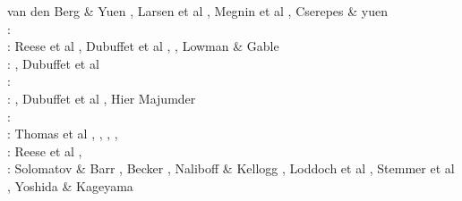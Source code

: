 \begin{scriptsize}
                      van den Berg \& Yuen \cite{vayu97}, Larsen et al \cite{laym97},
                      Megnin et al \cite{mebr97}, Cserepes \& yuen \cite{csyu97}\\
\nineteenninetyeight: \cite{ande98}\cite{iwho98}\cite{devv98}\cite{tack98}\cite{tack98b}\cite{trha98b}
      \cite{trha98}\cite{burl98}\cite{mokm98}\cite{lena98}\cite{vayu98}\cite{wema98}\\
\nineteenninetynine: Reese et al \cite{resb99}, Dubuffet et al \cite{duyr99}, \cite{vazh99}\cite{dava99}\cite{tabg99}\cite{como99}\cite{cicv99}\cite{trrj99},
                      Lowman \& Gable \cite{loga99}\\ 
\twothousand: \cite{albe00}\cite{hayu00}
              \cite{devv00b}\cite{tack00}
              \cite{tack00b}\cite{tack00c}
              \cite{tack00d}\cite{zhzm00}
              \cite{legm00}\cite{conr00}
              \cite{somo00},  Dubuffet et al \cite{duyu00,duyy00}\\
\twothousandone: \cite{vank01}\cite{riyb01}
                 \cite{lemo01}\cite{vays01}
                 \cite{moqu01}\cite{zhon01}
                 \cite{burm01}\cite{dabu01}\\
\twothousandtwo: \cite{tasu02}\cite{modm02}
                 \cite{tack02}\cite{vaya02}
                 \cite{vayu02}\cite{taxi02}
                 \cite{scbh02}\cite{strb02}, 
                 Dubuffet et al \cite{duyr02}, Hier Majumder \etal{} \cite{hiys02}\\
\twothousandthree: \cite{hapa03}\cite{lemo03}
                   \cite{mumc03}\cite{fasa03}
                   \cite{heta03}\cite{sibu03}
                   \cite{ogaw03,ogaw03b}\\
\twothousandfour: Thomas et al \cite{thkl04}, \cite{vavv04b}
                  \cite{xita04b}\cite{xita04},
                  \cite{nata04b}\cite{vayr04},
                  \cite{brws04}\cite{stsh04},
                  \cite{scbh04}\\
\twothousandfive: Reese et al \cite{resb05}, \cite{taxn05}
                  \cite{bupc05}\cite{grlt05}
                  \cite{lemj05}\cite{kogk05}
                  \cite{mczh05b}\cite{vary05}
                  \cite{nata05}\cite{nabu05}
                  \cite{chob05}\cite{phbu05}
                  \cite{hosh05}\\
\twothousandsix: Solomatov \& Barr \cite{soba06}, Becker \cite{beck06}, Naliboff \& Kellogg \cite{nake06},
                 Loddoch et al \cite{losh06}, Stemmer et al \cite{sthh06}, Yoshida \& Kageyama \cite{yoka06}\\

\end{scriptsize}
